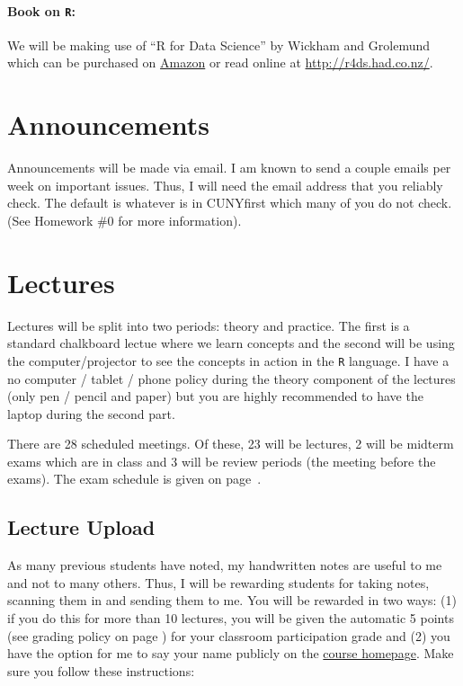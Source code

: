 \documentclass[12pt]{article}
\newcommand{\coursewebpage}{\href{https://github.com/kapelner/QC_Math_390.4_Spring_2019}{course homepage}}
\newcommand{\qu}[1]{``#1''}
\begin{document}
\paragraph{Book on \texttt{R}:} We will be making use of \qu{R for Data Science} by Wickham and Grolemund which can be purchased on \href{https://www.amazon.com/R-Data-Science-Hadley-Wickham/dp/1491910399}{Amazon} or read online at \url{http://r4ds.had.co.nz/}.


\section*{Announcements}

Announcements will be made via email. I am known to send a couple emails per week on important issues. Thus, I will need the email address that you reliably check. The default is whatever is in CUNYfirst which many of you do not check. (See Homework \#0 for more information).

\section*{Lectures}

Lectures will be split into two periods: theory and practice. The first is a standard chalkboard lectue where we learn concepts and the second will be using the computer/projector to see the concepts in action in the \texttt{R} language. I have a no computer / tablet / phone policy during the theory component of the lectures (only pen / pencil and paper) but you are highly recommended to have the laptop during the second part.

There are 28 scheduled meetings. Of these, 23 will be lectures, 2 will be midterm exams which are in class and 3 will be review periods (the meeting before the exams). The exam schedule is given on page~\pageref{subsec:exam_schedule}.

\subsection*{Lecture Upload}

As many previous students have noted, my handwritten notes are useful to me and not to many others. Thus, I will be rewarding students for taking notes, scanning them in and sending them to me. You will be rewarded in two ways: (1) if you do this for more than 10 lectures, you will be given the automatic 5 points (see grading policy on page \pageref{sec:grading}) for your classroom participation grade and (2) you have the option for me to say your name publicly on the \coursewebpage. Make sure you follow these instructions:
\end{document}
